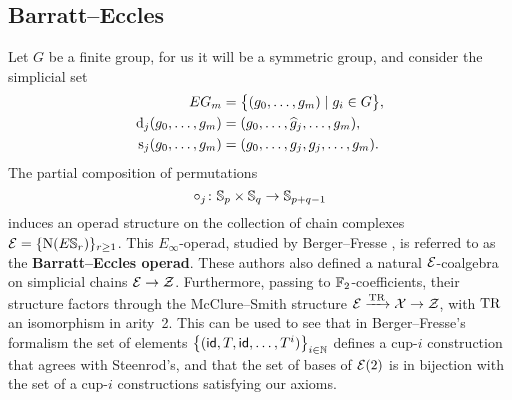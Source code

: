 \subsection{Barratt--Eccles}

Let $G$ be a finite group, for us it will be a symmetric group, and consider the simplicial set
\[
\begin{split}
	EG_m &= \big\{ (g_0, \dots, g_m) \mid g_i \in G \big\}, \\
	\operatorname{d}_j(g_0, \dots, g_m) &= (g_0, \dots, \widehat g_j, \dots, g_m), \\
	\operatorname{s}_j(g_0, \dots, g_m) &= (g_0, \dots, g_j, g_j, \dots, g_m).
\end{split}
\]
The partial composition of permutations
\[
\circ_j \colon \mathbb{S}_p \times \mathbb{S}_q \to \mathbb{S}_{p+q-1}
\]
induces an operad structure on the collection of chain complexes $\mathcal{E} = \{\operatorname{N}(E \mathbb{S}_r)\}_{r\geq1}$.
This $E_\infty$-operad, studied by Berger--Fresse \cite{berger2004combinatorial}, is referred to as the \textbf{Barratt--Eccles operad}.
These authors also defined a natural $\mathcal{E}$-coalgebra on simplicial chains $\mathcal{E} \to \mathcal{Z}$.
Furthermore, passing to ${\mathbb{F}_2}$-coefficients, their structure factors through the McClure--Smith structure $\mathcal{E} \xrightarrow{\operatorname{TR}} \mathcal{X} \to \mathcal{Z}$, with $\operatorname{TR}$ an isomorphism in arity~2.
This can be used to see that in Berger--Fresse's formalism the set of elements $\big\{ (\mathsf{id}, T, \mathsf{id}, \dots, T^i) \big\}_{i \in \mathbb{N}}$ defines a \mbox{cup-$i$} construction that agrees with Steenrod's, and that the set of bases of $\mathcal{E}(2)$ is in bijection with the set of a \mbox{cup-$i$} constructions satisfying our axioms.